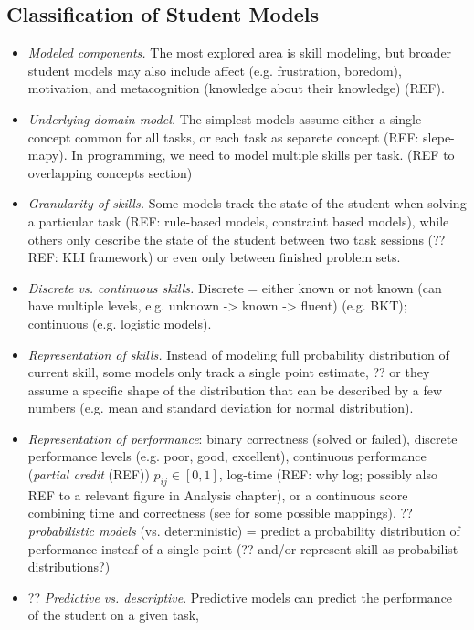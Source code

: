 \subsection{Classification of Student Models}

\begin{itemize}
\item \emph{Modeled components.}
The most explored area is skill modeling, but broader student models may also
include affect (e.g. frustration, boredom), motivation, and metacognition
(knowledge about their knowledge) (REF).
\item \emph{Underlying domain model.}
The simplest models assume either a single concept common for all tasks,
or each task as separete concept (REF: slepe-mapy). In programming,
we need to model multiple skills per task.
(REF to overlapping concepts section)
\item \emph{Granularity of skills.}
Some models track the state of the student when solving a particular task
(REF: rule-based models, constraint based models), while others
only describe the state of the student between two task sessions
(??REF: KLI framework) or even only between finished problem sets.
\item \emph{Discrete vs. continuous skills.}
Discrete = either known or not known (can have multiple levels, e.g.
unknown -> known -> fluent) (e.g. BKT); continuous (e.g. logistic models).
\cite{pelanek-learner-modeling}
\item \emph{Representation of skills.}
Instead of modeling full probability distribution of current skill, some models
only track a single point estimate,
?? or they assume a specific shape of the distribution that can be described by
a few numbers (e.g. mean and standard deviation for normal distribution).
\item \emph{Representation of performance}:
  binary correctness (solved or failed),
  discrete performance levels (e.g. poor, good, excellent),
  continuous performance (\emph{partial credit} (REF)) $p_{ij} \in [0, 1]$,
  log-time (REF: why log; possibly also REF to a relevant figure in Analysis chapter),
  or a continuous score combining time and correctness
  (see \cite[p.106]{rihak-phd} for some possible mappings).
?? \emph{probabilistic models} (vs. deterministic)
  = predict a probability distribution of performance insteaf of a single point
  (?? and/or represent skill as probabilist distributions?)
\item ?? \emph{Predictive vs. descriptive}.
Predictive models can predict the performance of the student on a given task,

\end{itemize}
